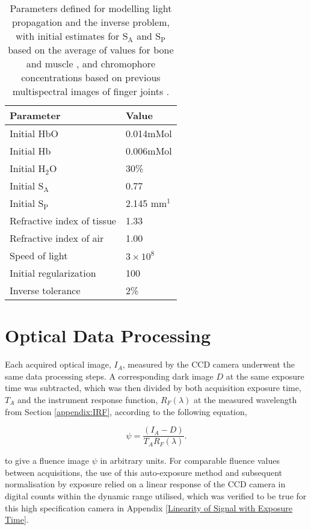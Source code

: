 \documentclass[twoside]{bhamthesis}
\theoremstyle{definition}
\begin{document}
\bgroup
\def\arraystretch{1.2}
\begin{table}[!ht]
\small
\begin{center}
 \begin{tabular}{l l} 
 \hline
 Parameter & Value\\ [0.4ex] 
 \hline
 Initial HbO &  0.014mMol \\ 
 Initial Hb & 0.006mMol \\
 Initial $\mathrm{H_2O}$ & 30\%\\
 Initial $\mathrm{S_A}$ & 0.77\\ 
 Initial $\mathrm{S_P}$ &  2.145 mm$^1$\\ 
 Refractive index of tissue & 1.33\\
 Refractive index of air & 1.00\\
 Speed of light & $3\times 10^8$\\
 Initial regularization & 100\\
 Inverse tolerance & 2\%\\
 \hline
\end{tabular}
\caption{Parameters defined for modelling light propagation and the inverse problem, with initial estimates for $\mathrm{S_A}$ and $\mathrm{S_P}$ based on the average of values for bone and muscle \cite{alexandrakis2005tomographic}, and chromophore concentrations based on previous multispectral images of finger joints \cite{yuan2010image}.}
\label{tab:ParametersTable}
\end{center}
\end{table}
\egroup

\section{Optical Data Processing}
\label{data_processing}

Each acquired optical image, $I_A$, measured by the CCD camera underwent the same data processing steps. A corresponding dark image $D$ at the same exposure time was subtracted, which was then divided by both acquisition exposure time, $T_A$ and the instrument response function, $R_F(\lambda)$ at the measured wavelength from Section \ref{appendix:IRF}, according to the following equation,

\begin{equation}
	\psi = \frac{(I_A - D)}{T_A R_F(\lambda)}.
\end{equation}

to give a fluence image $\psi$ in arbitrary units.  For comparable fluence values between acquisitions, the use of this auto-exposure method and subsequent normalisation by exposure relied on a linear response of the CCD camera in digital counts within the dynamic range utilised, which was verified to be true for this high specification camera in Appendix \ref{Linearity of Signal with Exposure Time}.
\end{document}
